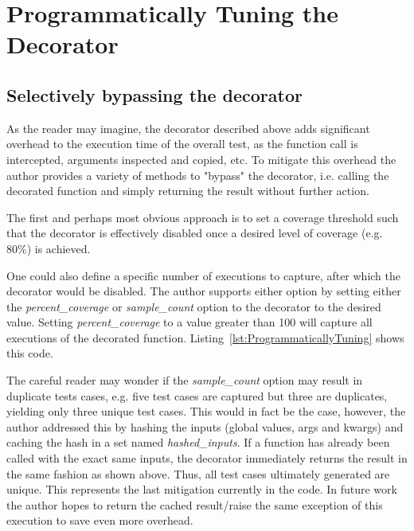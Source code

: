 

\section{Programmatically Tuning the Decorator}\label{sec:decorator tuning}

\subsection{Selectively bypassing the decorator}\label{sec:tuning-1}

As the reader may imagine, the decorator described above adds significant overhead 
to the execution time of the overall test, as the function call is intercepted,
arguments inspected and copied, etc.  To mitigate this overhead the author provides 
a variety of methods to "bypass" the decorator, i.e. calling the decorated 
function and simply returning the result without further action.

The first and perhaps most obvious approach is to set a coverage threshold such 
that the decorator is effectively disabled once a desired level of coverage 
(e.g. 80\%) is achieved. 

One could also define a specific number 
of executions to capture, after which the decorator would be disabled. 
The author supports either option by setting either the \textit{percent\_coverage} or 
\textit{sample\_count} option to the decorator to the desired value.  Setting 
\textit{percent\_coverage} to a value greater than 100 will capture all 
executions of the decorated function.  Listing~\ref{lst:ProgrammaticallyTuning}
shows this code.


The careful reader may wonder if the \textit{sample\_count} option may result in 
duplicate tests cases, e.g. five test cases are captured but three are duplicates, 
yielding only three unique test cases.  This would in fact be the case, however, the author 
addressed this by hashing the inputs (global values, args and kwargs) and 
caching the hash in a set named \textit{hashed\_inputs}.  If a function has
already been called with the exact same inputs, the decorator immediately returns
the result in the same fashion as shown above. Thus, all test cases 
ultimately generated are unique.  This represents the last mitigation
currently in the code.  In future work the author hopes to return the cached 
result/raise the same exception of this execution to save even more overhead.  


